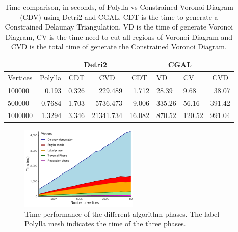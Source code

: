 \documentclass[lineno,pdflatex,sn-mathphys]{sn-jnl}%
\theoremstyle{thmstyleone}%
\theoremstyle{thmstyletwo}%
\theoremstyle{thmstylethree}%
\begin{document}
\begin{table}[]
\centering
\begin{tabular}{lr|rr|rllr|}
\cmidrule{3-8} \addlinespace[-.6em]
                               & \multicolumn{1}{c|}{}        & \multicolumn{2}{c|}{Detri2}                           & \multicolumn{4}{c|}{CGAL}                                                                                          \\ \hline
\multicolumn{1}{|l|}{Vertices} & \multicolumn{1}{c|}{Polylla} & \multicolumn{1}{c|}{CDT}   & \multicolumn{1}{c|}{CVD} & \multicolumn{1}{c|}{CDT}    & \multicolumn{1}{l|}{VD}     & \multicolumn{1}{l|}{CV}     & \multicolumn{1}{c|}{CVD} \\ \hline
\multicolumn{1}{|l|}{100000}   & 0.193                        & \multicolumn{1}{r|}{0.326} & 229.489                  & \multicolumn{1}{r|}{1.712}  & \multicolumn{1}{l|}{28.39}  & \multicolumn{1}{l|}{9.68}   & 38.07                    \\ \hline
\multicolumn{1}{|l|}{500000}   & 0.7684                       & \multicolumn{1}{r|}{1.703} & 5736.473                 & \multicolumn{1}{r|}{9.006}  & \multicolumn{1}{l|}{335.26} & \multicolumn{1}{l|}{56.16}  & 391.42                   \\ \hline
\multicolumn{1}{|l|}{1000000}  & 1.3294                       & \multicolumn{1}{r|}{3.346} & 21341.734                & \multicolumn{1}{r|}{16.082} & \multicolumn{1}{l|}{870.52} & \multicolumn{1}{l|}{120.52} & 991.04                   \\ \hline
\end{tabular}
\caption{Time comparison, in seconds, of Polylla vs Constrained Voronoi Diagram (CDV) using Detri2 and CGAL. CDT is the time to generate a Constrained Delaunay Triangulation, VD is the time of generate Voronoi Diagram, CV is the time need to cut all regions of Voronoi Diagram and CVD is the total time of generate the Constrained Voronoi Diagram. }%
\label{table:compvoropoylla}
\end{table}



\begin{figure}
\centering     %

\includegraphics[width=0.5\textwidth]{timecompB}
\caption{Time performance of the  different algorithm phases. The label Polylla mesh indicates  the time of the three phases.
}
\label{fig:timecomp} 
\end{figure}
\end{document}
